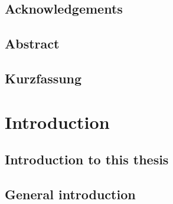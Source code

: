 \documentclass[12pt,a4paper,bibliography=totoc,BCOR=10mm]{scrreprt} %
\begin{document}




\chapter*{}
\label{ch:declaration}


\chapter*{Acknowledgements}
\label{ch:acknowledgements}


\chapter*{Abstract}
\label{ch:abstract}


\chapter*{Kurzfassung}
\label{ch:kurzfassung}


\setcounter{tocdepth}{2}
\tableofcontents
{}
\newpage
\cleardoublepage
{}
\setcounter{page}{1}

\part{Introduction}
\label{pt:introduction}

\chapter*{Introduction to this thesis}


\chapter{General introduction}
\label{ch:intro/general}

\end{document}
